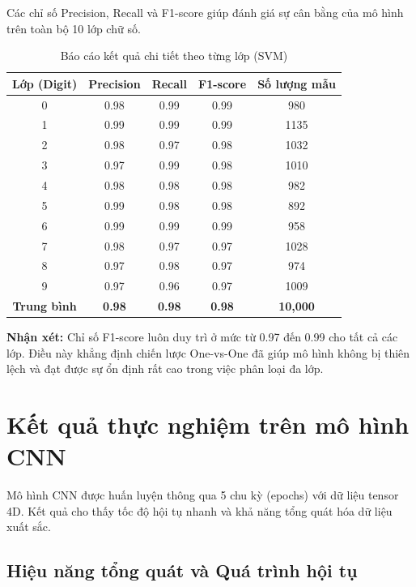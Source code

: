 \documentclass[../DoAn.tex]{subfiles}
\begin{document}
Các chỉ số Precision, Recall và F1-score giúp đánh giá sự cân bằng của mô hình trên toàn bộ 10 lớp chữ số.

\begin{table}[H]
\centering
\caption{Báo cáo kết quả chi tiết theo từng lớp (SVM)}
\label{tab:svm_report}
\begin{tabular}{|c|c|c|c|c|}
\hline
\textbf{Lớp (Digit)} & \textbf{Precision} & \textbf{Recall} & \textbf{F1-score} & \textbf{Số lượng mẫu} \\ \hline
0 & 0.98 & 0.99 & 0.99 & 980 \\ \hline
1 & 0.99 & 0.99 & 0.99 & 1135 \\ \hline
2 & 0.98 & 0.97 & 0.98 & 1032 \\ \hline
3 & 0.97 & 0.99 & 0.98 & 1010 \\ \hline
4 & 0.98 & 0.98 & 0.98 & 982 \\ \hline
5 & 0.99 & 0.98 & 0.98 & 892 \\ \hline
6 & 0.99 & 0.99 & 0.99 & 958 \\ \hline
7 & 0.98 & 0.97 & 0.97 & 1028 \\ \hline
8 & 0.97 & 0.98 & 0.97 & 974 \\ \hline
9 & 0.97 & 0.96 & 0.97 & 1009 \\ \hline
\hline
\textbf{Trung bình} & \textbf{0.98} & \textbf{0.98} & \textbf{0.98} & \textbf{10,000} \\ \hline
\end{tabular}
\end{table}

\textbf{Nhận xét:} Chỉ số F1-score luôn duy trì ở mức từ 0.97 đến 0.99 cho tất cả các lớp. Điều này khẳng định chiến lược One-vs-One đã giúp mô hình không bị thiên lệch và đạt được sự ổn định rất cao trong việc phân loại đa lớp.

\section{Kết quả thực nghiệm trên mô hình CNN}

Mô hình CNN được huấn luyện thông qua 5 chu kỳ (epochs) với dữ liệu tensor 4D. Kết quả cho thấy tốc độ hội tụ nhanh và khả năng tổng quát hóa dữ liệu xuất sắc.\\

\subsection{Hiệu năng tổng quát và Quá trình hội tụ}
\end{document}
